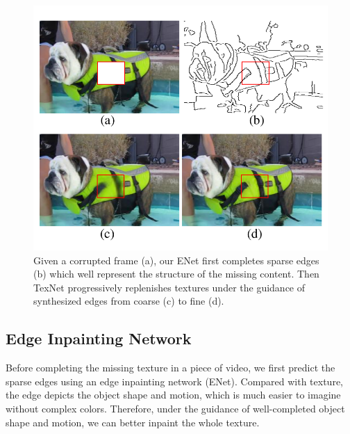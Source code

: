 \begin{figure}[t]
	\centering
	\includegraphics[width=0.8\columnwidth]{coars-fine} %
	\caption{Given a corrupted frame (a), our ENet first completes sparse edges (b) which well represent the structure of the missing content. Then TexNet progressively replenishes textures under the guidance of synthesized edges from coarse (c) to fine (d).}
	
	\label{fig:coarse-fine}
\end{figure}

\subsection{Edge Inpainting Network}
\label{sec:edgenet}
Before completing the missing texture in a piece of video, we first predict the sparse edges using an edge inpainting network (ENet).
Compared with texture, the edge depicts the object shape and motion, which is much easier to imagine without complex colors.
Therefore, under the guidance of well-completed object shape and motion, we can better inpaint the whole texture.
 

